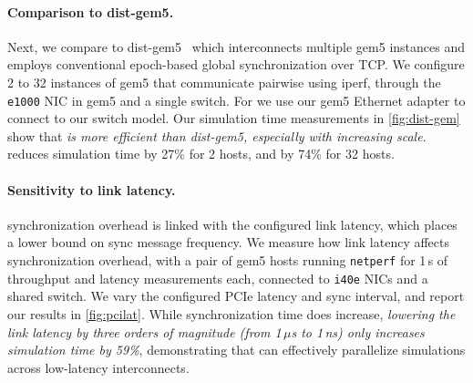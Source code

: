 \paragraph{Comparison to dist-gem5.}
Next, we compare to dist-gem5~\cite{mohammad:distgem5} which
interconnects multiple gem5 instances and employs conventional
epoch-based global synchronization over TCP.
%
We configure 2 to 32 instances of gem5 that communicate pairwise using
iperf, through the \texttt{e1000} NIC in gem5 and a single switch.
%
For \sysname we use our gem5 Ethernet adapter to connect to our
switch model.
%
Our simulation time measurements in \autoref{fig:dist-gem} show that
\emph{\sysname is more efficient than dist-gem5, especially with
increasing scale}.
%
\sysname reduces simulation time by 27\% for 2 hosts, and by 74\% for 32 hosts.

\paragraph{Sensitivity to link latency.}
\sysname synchronization overhead is linked with the configured link
latency, which places a lower bound on sync message frequency.
%
We measure how link latency affects synchronization overhead, with
a pair of gem5 hosts running \texttt{netperf} for 1\,s of throughput
and latency measurements each, connected to \texttt{i40e} NICs and a
shared switch.
%
We vary the configured PCIe latency and sync interval, and report our
results in \autoref{fig:pcilat}.
%
While synchronization time does increase, \emph{lowering the link
latency by three orders of magnitude (from 1\,$\mu$s to 1\,ns) only
increases simulation time by 59\%}, demonstrating that \sysname can
effectively parallelize simulations across low-latency interconnects.


